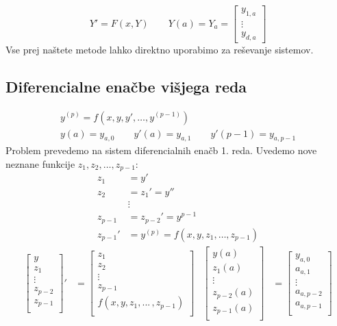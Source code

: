 \begin{multicols}{5}
\[ Y' = F(x, Y) \qquad Y(a) = Y_a = \begin{bmatrix}
    y_{1,a} \\
    \vdots \\
    y_{d,a}
\end{bmatrix}\]
Vse prej naštete metode lahko direktno uporabimo za reševanje sistemov.

\subsection*{Diferencialne enačbe višjega reda}
\begin{gather*}    
    y^{(p)} = f(x, y, y', \dots, y^{(p-1)}) \\
    y(a) = y_{a,0} \qquad y'(a) = y_{a,1} \qquad y'(p-1) = y_{a,p-1} 
\end{gather*}   
Problem prevedemo na sistem diferencialnih enačb 1. reda.
Uvedemo nove neznane funkcije $z_1, z_2, \dots, z_{p-1}$:
\begin{align*}
    z_1 &= y' \\
    z_2 &= z_1' = y'' \\
    & \vdots \\
    z_{p-1} &= z_{p-2}' = y^{p-1} \\
    z_{p-1}' &= y^{(p)} = f(x, y, z_1, \dots, z_{p-1})
\end{align*}
\begin{align*}
    \begin{bmatrix}
        y \\
        z_1 \\
        \vdots \\
        z_{p-2} \\
        z_{p-1} \\
    \end{bmatrix}'
    &=
    \begin{bmatrix}
        z_1 \\
        z_2 \\
        \vdots \\
        z_{p-1} \\
        f(x,y, z_1, ...\, , z_{p-1}) \\
    \end{bmatrix}
    &
    \begin{bmatrix}
        y(a) \\
        z_1(a) \\
        \vdots \\
        z_{p-2}(a) \\
        z_{p-1}(a) \\
    \end{bmatrix}
    &=
    \begin{bmatrix}
        y_{a,0} \\
        a_{a,1} \\
        \vdots \\
        a_{a,p-2} \\
        a_{a,p-1} \\
    \end{bmatrix}
\end{align*}


\end{multicols}
